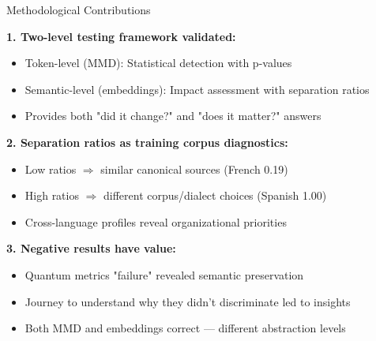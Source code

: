 \documentclass[aspectratio=169,11pt]{beamer}
\begin{document}
\begin{frame}{Methodological Contributions}

\textbf{1. Two-level testing framework validated:}
\begin{itemize}
  \item Token-level (MMD): Statistical detection with p-values
  \item Semantic-level (embeddings): Impact assessment with separation ratios
  \item Provides both "did it change?" and "does it matter?" answers
\end{itemize}

\vspace{0.5em}

\textbf{2. Separation ratios as training corpus diagnostics:}
\begin{itemize}
  \item Low ratios $\Rightarrow$ similar canonical sources (French 0.19)
  \item High ratios $\Rightarrow$ different corpus/dialect choices (Spanish 1.00)
  \item Cross-language profiles reveal organizational priorities
\end{itemize}

\vspace{0.5em}

\textbf{3. Negative results have value:}
\begin{itemize}
  \item Quantum metrics "failure" revealed semantic preservation
  \item Journey to understand why they didn't discriminate led to insights
  \item Both MMD and embeddings correct — different abstraction levels
\end{itemize}

\end{frame}
\end{document}
